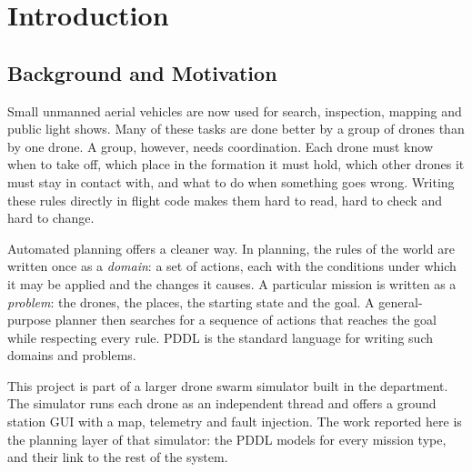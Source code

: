 \documentclass[11pt,a4paper,oneside]{report}
\begin{document}
\clearpage
{}

\chapter{Introduction}

\section{Background and Motivation}
Small unmanned aerial vehicles are now used for search, inspection, mapping and public light
shows. Many of these tasks are done better by a group of drones than by one drone. A group,
however, needs coordination. Each drone must know when to take off, which place in the
formation it must hold, which other drones it must stay in contact with, and what to do when
something goes wrong. Writing these rules directly in flight code makes them hard to read, hard
to check and hard to change.

Automated planning offers a cleaner way. In planning, the rules of the world are written once as
a \emph{domain}: a set of actions, each with the conditions under which it may be applied and the
changes it causes. A particular mission is written as a \emph{problem}: the drones, the places,
the starting state and the goal. A general-purpose planner then searches for a sequence of
actions that reaches the goal while respecting every rule. PDDL is the standard language for
writing such domains and problems.

This project is part of a larger drone swarm simulator built in the department. The simulator
runs each drone as an independent thread and offers a ground station GUI with a map, telemetry
and fault injection. The work reported here is the planning layer of that simulator: the PDDL
models for every mission type, and their link to the rest of the system.
\end{document}
